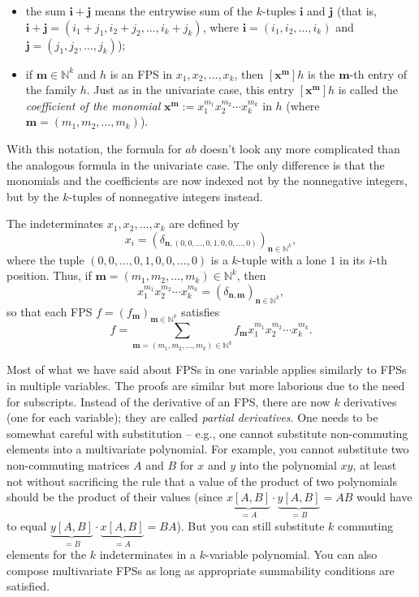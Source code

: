 \begin{itemize}
\item the sum $\mathbf{i}+\mathbf{j}$ means the entrywise sum of the
$k$-tuples $\mathbf{i}$ and $\mathbf{j}$ (that is, $\mathbf{i}+\mathbf{j}%
=\left(  i_{1}+j_{1},i_{2}+j_{2},\ldots,i_{k}+j_{k}\right)  $, where
$\mathbf{i}=\left(  i_{1},i_{2},\ldots,i_{k}\right)  $ and $\mathbf{j}=\left(
j_{1},j_{2},\ldots,j_{k}\right)  $);

\item if $\mathbf{m}\in\mathbb{N}^{k}$ and $h$ is an FPS in $x_{1}%
,x_{2},\ldots,x_{k}$, then $\left[  \mathbf{x}^{\mathbf{m}}\right]  h$ is the
$\mathbf{m}$-th entry of the family $h$. Just as in the univariate case, this
entry $\left[  \mathbf{x}^{\mathbf{m}}\right]  h$ is called the
\emph{coefficient of the monomial} $\mathbf{x}^{\mathbf{m}}:=x_{1}^{m_{1}%
}x_{2}^{m_{2}}\cdots x_{k}^{m_{k}}$ in $h$ (where $\mathbf{m}=\left(
m_{1},m_{2},\ldots,m_{k}\right)  $).
\end{itemize}

With this notation, the formula for $ab$ doesn't look any more complicated
than the analogous formula in the univariate case. The only difference is that
the monomials and the coefficients are now indexed not by the nonnegative
integers, but by the $k$-tuples of nonnegative integers instead.

The indeterminates $x_{1},x_{2},\ldots,x_{k}$ are defined by%
\[
x_{i}=\left(  \delta_{\mathbf{n},\left(  0,0,\ldots,0,1,0,0,\ldots,0\right)
}\right)  _{\mathbf{n}\in\mathbb{N}^{k}},
\]
where the tuple $\left(  0,0,\ldots,0,1,0,0,\ldots,0\right)  $ is a $k$-tuple
with a lone $1$ in its $i$-th position. Thus, if $\mathbf{m}=\left(
m_{1},m_{2},\ldots,m_{k}\right)  \in\mathbb{N}^{k}$, then%
\[
x_{1}^{m_{1}}x_{2}^{m_{2}}\cdots x_{k}^{m_{k}}=\left(  \delta_{\mathbf{n}%
,\mathbf{m}}\right)  _{\mathbf{n}\in\mathbb{N}^{k}},
\]
so that each FPS $f=\left(  f_{\mathbf{m}}\right)  _{\mathbf{m}\in
\mathbb{N}^{k}}$ satisfies%
\[
f=\sum_{\mathbf{m}=\left(  m_{1},m_{2},\ldots,m_{k}\right)  \in\mathbb{N}^{k}%
}f_{\mathbf{m}}x_{1}^{m_{1}}x_{2}^{m_{2}}\cdots x_{k}^{m_{k}}.
\]


Most of what we have said about FPSs in one variable applies similarly to FPSs
in multiple variables. The proofs are similar but more laborious due to the
need for subscripts. Instead of the derivative of an FPS, there are now $k$
derivatives (one for each variable); they are called \emph{partial
derivatives}. One needs to be somewhat careful with substitution -- e.g., one
cannot substitute non-commuting elements into a multivariate polynomial. For
example, you cannot substitute two non-commuting matrices $A$ and $B$ for $x$
and $y$ into the polynomial $xy$, at least not without sacrificing the rule
that a value of the product of two polynomials should be the product of their
values (since $\underbrace{x\left[  A,B\right]  }_{=A}\cdot
\underbrace{y\left[  A,B\right]  }_{=B}=AB$ would have to equal
$\underbrace{y\left[  A,B\right]  }_{=B}\cdot\underbrace{x\left[  A,B\right]
}_{=A}=BA$). But you can still substitute $k$ commuting elements for the $k$
indeterminates in a $k$-variable polynomial. You can also compose multivariate
FPSs as long as appropriate summability conditions are satisfied.

